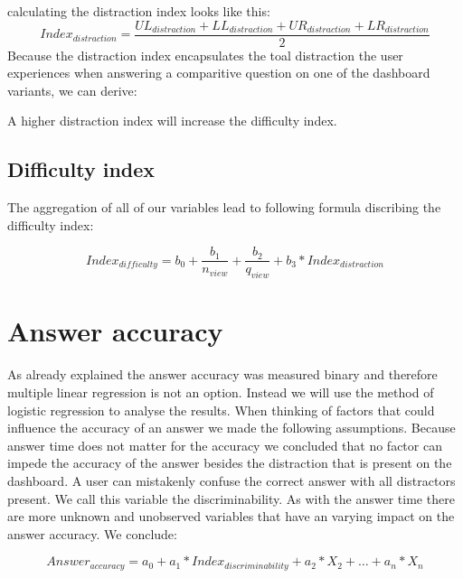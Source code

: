 calculating the distraction index looks like this:
\begin{equation} \label{distractionIndexEquation}
    Index_{distraction} = \frac{UL_{distraction} + LL_{distraction} + UR_{distraction} + LR_{distraction}}{2}
\end{equation} 
Because the distraction index encapsulates the toal distraction the user experiences when answering a comparitive question on one of the dashboard variants,
we can derive:
\begin{statements}[resume]
    \item A higher distraction index will increase the difficulty index.
\end{statements}

\subsection{Difficulty index}

The aggregation of all of our variables lead to following formula discribing the difficulty index:

\begin{equation} \label{difficultyIndexEquation}
    Index_{difficulty} = b_0 + \frac{b_1}{n_{view}} + \frac{b_2}{q_{view}} + b_3 * Index_{distraction}
\end{equation}


\section{Answer accuracy}
As already explained the answer accuracy was measured binary and therefore multiple linear regression is not an option. Instead we will use the
method of logistic regression to analyse the results. When thinking of factors that could influence the accuracy of an answer we made the
following assumptions. Because answer time does not matter for the accuracy we concluded that no factor can impede the accuracy of the answer besides the
distraction that is present on the dashboard. A user can mistakenly confuse the correct answer with all distractors present. We call this variable the
discriminability. As with the answer time there are more unknown and unobserved variables that have an varying impact on the answer accuracy.
We conclude:

\begin{equation} \label{answerAccuracyEquation}
    Answer_{accuracy} = a_0 + a_1 * Index_{discriminability} + a_2 * X_2 + \dots + a_n * X_n
\end{equation}

